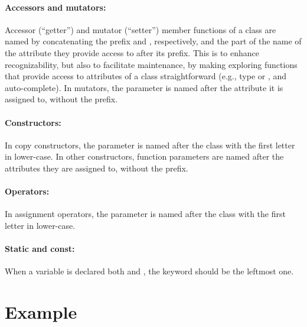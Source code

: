 \documentclass[footinclude=false,11pt,DIV11]{scrartcl}
\begin{document}
\paragraph{Accessors and mutators:} Accessor (``getter'') and mutator (``setter'')
member functions of a class are named by concatenating the prefix  and
, respectively, and the part of the name of the attribute they provide
access to after its  prefix. This is to enhance recognizability, but also to
facilitate maintenance, by making exploring functions that provide access to attributes
of a class straightforward (e.g., type  or , and
auto-complete). In mutators, the parameter is named after the attribute it is assigned
to, without the  prefix.

\paragraph{Constructors:} In copy constructors, the parameter is named after the class
with the first letter in lower-case. In other constructors, function parameters are
named after the attributes they are assigned to, without the  prefix.

\paragraph{Operators:} In assignment operators, the parameter is named after the class
with the first letter in lower-case.

\paragraph{Static and const:} When a variable is declared both  and
, the  keyword should be the leftmost one.


\section{Example}
\end{document}
